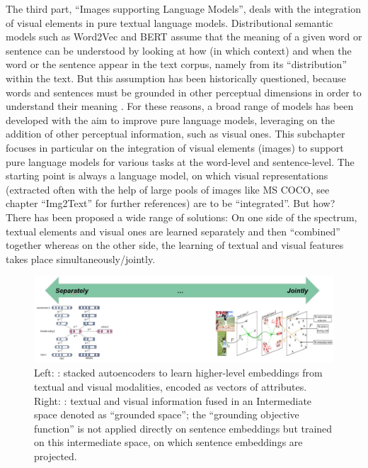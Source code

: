 \documentclass[
]{krantz}
\begin{document}
The third part, ``Images supporting Language Models'', deals with the integration of visual elements in pure textual language models.
Distributional semantic models such as Word2Vec and BERT assume that the meaning of a given word or sentence can be understood by looking at how (in which context) and when the word or the sentence appear in the text corpus, namely from its ``distribution'' within the text.
But this assumption has been historically questioned, because words and sentences must be grounded in other perceptual dimensions in order to understand their meaning \citep[see for example the ``symbol grounding problem'';][]{harnad1990symbol}.
For these reasons, a broad range of models has been developed with the aim to improve pure language models, leveraging on the addition of other perceptual information, such as visual ones.
This subchapter focuses in particular on the integration of visual elements (images) to support pure language models for various tasks at the word-level and sentence-level.
The starting point is always a language model, on which visual representations (extracted often with the help of large pools of images like MS COCO, see chapter ``Img2Text'' for further references) are to be ``integrated''.
But how?
There has been proposed a wide range of solutions:
On one side of the spectrum, textual elements and visual ones are learned separately and then ``combined'' together whereas on the other side, the learning of textual and visual features takes place simultaneously/jointly.

\begin{figure}

{\centering \includegraphics[width=1\linewidth]{figures/02-chapter2/Img_Ch_Intro} 

}

\caption{Left: \citet{silberer2012learning}: stacked autoencoders to learn higher-level embeddings from textual and visual modalities, encoded as vectors of attributes. Right: \citet{bordes2020incorporating}: textual and visual information fused in an Intermediate space denoted as ``grounded space''; the ``grounding objective function'' is not applied directly on sentence embeddings but trained on this intermediate space, on which sentence embeddings are projected.}\label{fig:f02-00-01}
\end{figure}
\end{document}
